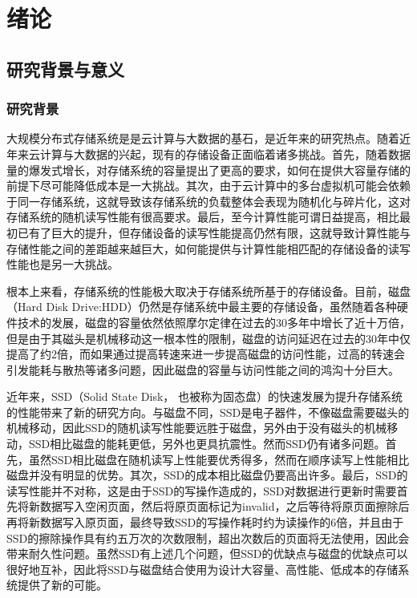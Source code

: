 
\chapter{绪论}
\label{chap:intro}

\section{研究背景与意义}

\subsection{研究背景}
\label{sec:backgrounds}

大规模分布式存储系统是是云计算与大数据的基石，是近年来的研究热点。随着近年来云计算与大数据的兴起，现有的存储设备正面临着诸多挑战。首先，随着数据量的爆发式增长，对存储系统的容量提出了更高的要求，如何在提供大容量存储的前提下尽可能降低成本是一大挑战。其次，由于云计算中的多台虚拟机可能会依赖于同一存储系统，这就导致该存储系统的负载整体会表现为随机化与碎片化，这对存储系统的随机读写性能有很高要求。最后，至今计算性能可谓日益提高，相比最初已有了巨大的提升，但存储设备的读写性能提高仍然有限，这就导致计算性能与存储性能之间的差距越来越巨大，如何能提供与计算性能相匹配的存储设备的读写性能也是另一大挑战。

根本上来看，存储系统的性能极大取决于存储系统所基于的存储设备。目前，磁盘（Hard Disk Drive:HDD）仍然是存储系统中最主要的存储设备，虽然随着各种硬件技术的发展，磁盘的容量依然依照摩尔定律在过去的30多年中增长了近十万倍，但是由于其磁头是机械移动这一根本性的限制，磁盘的访问延迟在过去的30年中仅提高了约2倍，而如果通过提高转速来进一步提高磁盘的访问性能，过高的转速会引发能耗与散热等诸多问题，因此磁盘的容量与访问性能之间的鸿沟十分巨大。

近年来，SSD（Solid State Disk， 也被称为固态盘）的快速发展为提升存储系统的性能带来了新的研究方向。与磁盘不同，SSD是电子器件，不像磁盘需要磁头的机械移动，因此SSD的随机读写性能要远胜于磁盘，另外由于没有磁头的机械移动，SSD相比磁盘的能耗更低，另外也更具抗震性。然而SSD仍有诸多问题。首先，虽然SSD相比磁盘在随机读写上性能要优秀得多，然而在顺序读写上性能相比磁盘并没有明显的优势。其次，SSD的成本相比磁盘仍要高出许多。最后，SSD的读写性能并不对称，这是由于SSD的写操作造成的，SSD对数据进行更新时需要首先将新数据写入空闲页面，然后将原页面标记为invalid，之后等待将原页面擦除后再将新数据写入原页面，最终导致SSD的写操作耗时约为读操作的6倍，并且由于SSD的擦除操作具有约五万次的次数限制，超出次数后的页面将无法使用，因此会带来耐久性问题。虽然SSD有上述几个问题，但SSD的优缺点与磁盘的优缺点可以很好地互补，因此将SSD与磁盘结合使用为设计大容量、高性能、低成本的存储系统提供了新的可能。

